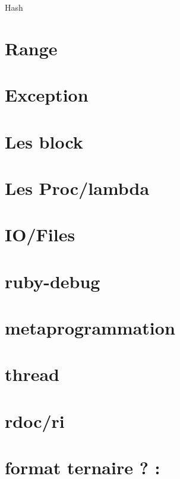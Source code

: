 \documentclass{beamer}
\begin{document}
\begin{frame}
  \begin{beamerboxesrounded}{Hash}
    
  \end{beamerboxesrounded}
\end{frame}

\section{Range}
\section{Exception}
\section{Les block}
\section{Les Proc/lambda}
\section{IO/Files}
\section{ruby-debug}
\section{metaprogrammation}
\section{thread}
\section{rdoc/ri}
\section{format ternaire ? :}
\end{document}
